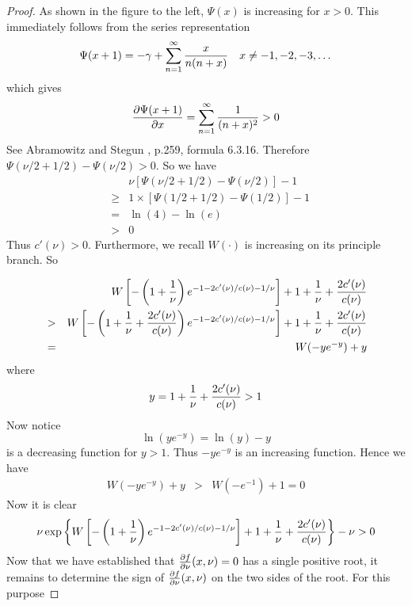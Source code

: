 \documentclass[11pt,a4]{amsart}
\newcommand{\pd}{\partial}
\newcommand{\1}{{\mathbf 1}}
\begin{document}
\begin{proof}
\begin{minipage}{0.48\textwidth}
  \end{minipage}\hfill
  \begin{minipage}{0.5\textwidth}
    As shown in the figure to the left, $\Psi(x)$ is increasing
    for $x > 0$. This immediately follows from the series
    representation
    \[
    \Psi(x + 1) = -\gamma + \sum_{n=1}^\infty {x \over n(n + x)}
    \quad x \neq -1, -2, -3,\dots
    \]
    which gives
    \[
    {\pd \Psi(x + 1) \over \pd x}
    = \sum_{n=1}^\infty {1 \over (n + x)^2} > 0
    \]
    See Abramowitz and Stegun \cite{abramowitz1972handbook}, p.259,
    formula 6.3.16. Therefore $\Psi(\nu/2 + 1/2) - \Psi(\nu/2) > 0$.
    So we have
    \begin{eqnarray*}
      && \nu \left[
        \Psi(\nu/2 + 1/2) - \Psi(\nu/2)
      \right] - 1 \\
      &\geq& 1 \times \left[
        \Psi(1/2 + 1/2) - \Psi(1/2)
      \right] - 1 \\
      &=& \ln(4) - \ln(e) \\
      &>& 0
    \end{eqnarray*}
    Thus $c'(\nu) > 0$. Furthermore, we recall
    $W(\cdot)$ is increasing on its principle branch. So
  \end{minipage}
  \begin{eqnarray*}
    &&
    W\left[
      -\left( 1 + {1 \over \nu} \right)
      e^{-1 - 2 c'(\nu)/c(\nu) - 1/\nu}
    \right]
    + 1 + {1 \over \nu} + {2 c'(\nu) \over c(\nu)} \\
    &>& 
    W\left[
      -\left( 1 + {1 \over \nu} + {2 c'(\nu) \over c(\nu)} \right)
      e^{-1 - 2 c'(\nu)/c(\nu) - 1/\nu}
    \right]
    + 1 + {1 \over \nu} + {2 c'(\nu) \over c(\nu)} \\
    &=& W(-y e^{-y}) + y
  \end{eqnarray*}
  where
  \[
  y = 1 + {1 \over \nu} + {2 c'(\nu) \over c(\nu)} > 1
  \]
  Now notice
  \[
  \ln(y e^{-y}) = \ln(y) - y
  \]
  is a decreasing function for $y > 1$. Thus $-y e^{-y}$ is an
  increasing function. Hence we have
  \begin{eqnarray*}
    W(-y e^{-y}) + y &>& W(-e^{-1}) + 1 = 0
  \end{eqnarray*}
  Now it is clear
  \[
  \nu\exp\left\{
    W\left[
      -\left(1 + {1 \over \nu}\right)
      e^{-1 - 2 c'(\nu)/c(\nu) - 1/\nu}
    \right]
    + 1 + {1 \over \nu} + {2 c'(\nu) \over c(\nu)}
  \right\} - \nu > 0
  \]
  Now that we have established that ${\pd f \over \pd \nu}(x, \nu) = 0$ has a
  single positive root, it remains to determine the sign of
  ${\pd f \over \pd \nu}(x, \nu)$ on the two sides of the root. For this purpose

\end{proof}
\end{document}

